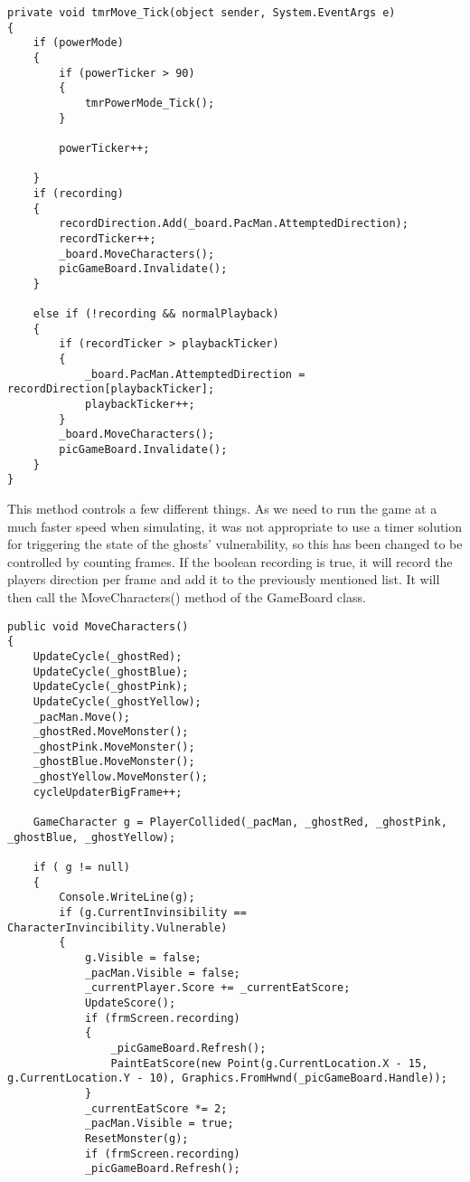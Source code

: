 \begin{lstlisting}[caption=Snippet of frmScreen. A method called at each timer interval, label=lst:timerInterval]
private void tmrMove_Tick(object sender, System.EventArgs e)
{
	if (powerMode)
	{
		if (powerTicker > 90)
		{
			tmrPowerMode_Tick();
		}

		powerTicker++;

	}
	if (recording)
	{
		recordDirection.Add(_board.PacMan.AttemptedDirection);
		recordTicker++;
		_board.MoveCharacters();
		picGameBoard.Invalidate();
	}

	else if (!recording && normalPlayback)
	{
		if (recordTicker > playbackTicker)
		{
			_board.PacMan.AttemptedDirection = recordDirection[playbackTicker];
			playbackTicker++;
		}
		_board.MoveCharacters();
		picGameBoard.Invalidate();
	}
}

\end{lstlisting}

This method controls a few different things. As we need to run the game at a much faster speed when simulating, it was not appropriate to use a timer solution for triggering the state of the ghosts’ vulnerability, so this has been changed to be controlled by counting frames. If the boolean recording is true, it will record the players direction per frame and add it to the previously mentioned list. It will then call the MoveCharacters() method of the GameBoard class.

\begin{lstlisting}[caption=Snippet of GameBoard.cs. Method used to move and check collision for each character.,label=lst:collision]
public void MoveCharacters()
{
	UpdateCycle(_ghostRed);
	UpdateCycle(_ghostBlue);
	UpdateCycle(_ghostPink);
	UpdateCycle(_ghostYellow);
	_pacMan.Move();
	_ghostRed.MoveMonster();
	_ghostPink.MoveMonster();
	_ghostBlue.MoveMonster();
	_ghostYellow.MoveMonster();
	cycleUpdaterBigFrame++;

	GameCharacter g = PlayerCollided(_pacMan, _ghostRed, _ghostPink, _ghostBlue, _ghostYellow);

	if ( g != null)
	{
		Console.WriteLine(g);
		if (g.CurrentInvinsibility == CharacterInvincibility.Vulnerable)
		{
			g.Visible = false;
			_pacMan.Visible = false;
			_currentPlayer.Score += _currentEatScore;
			UpdateScore();
			if (frmScreen.recording)
			{
				_picGameBoard.Refresh();
				PaintEatScore(new Point(g.CurrentLocation.X - 15, g.CurrentLocation.Y - 10), Graphics.FromHwnd(_picGameBoard.Handle));
			}
			_currentEatScore *= 2;
			_pacMan.Visible = true;
			ResetMonster(g);
			if (frmScreen.recording)
			_picGameBoard.Refresh();

\end{lstlisting}

